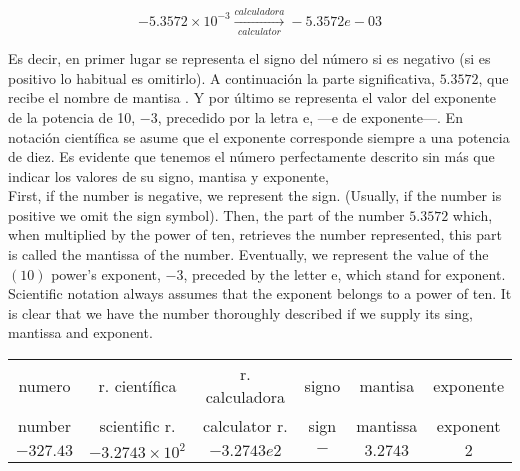 \begin{equation*}
-5.3572\times 10^{-3}  \xrightarrow[calculator]{calculadora}  -5.3572e-03
\end{equation*}

\begin{paracol}{2}
Es decir, en primer lugar se representa el signo del número si es negativo (si es positivo lo habitual es omitirlo). A continuación la parte significativa, $5.3572$, que recibe el nombre de mantisa  . Y por último se representa el valor del exponente de la potencia de 10, $-3$, precedido por la letra e, ---e de exponente---. En notación científica se asume que el exponente corresponde siempre a una potencia de diez. Es evidente que tenemos el número perfectamente descrito sin más que indicar los valores de su signo, mantisa y exponente,\\

\switchcolumn
First, if the number is negative, we represent the sign. (Usually, if the number is positive we omit the sign symbol). Then, the part of the number $5.3572$ which, when  multiplied by the power of ten, retrieves the number represented, this part is called the mantissa of the number. Eventually, we represent the value of the $(10)$ power's  exponent, $-3$, preceded by the letter e, which stand for exponent. Scientific notation always assumes that the exponent belongs to a power of ten. It is clear that we have the number thoroughly described if we supply its sing, mantissa and exponent.  
\end{paracol}
\begin{table}[H]
\centering
\begin{tabular}{|c||c||c||c|c|c|}
\hline
numero&r. científica&r. calculadora&signo&mantisa&exponente\\
number&scientific r.&calculator r.&sign&mantissa&exponent\\
\hline
$-327.43$&$-3.2743\times 10^2$&$-3.2743e2$&$-$&$3.2743$&$2$\\
\hline
\end{tabular}
\end{table}

